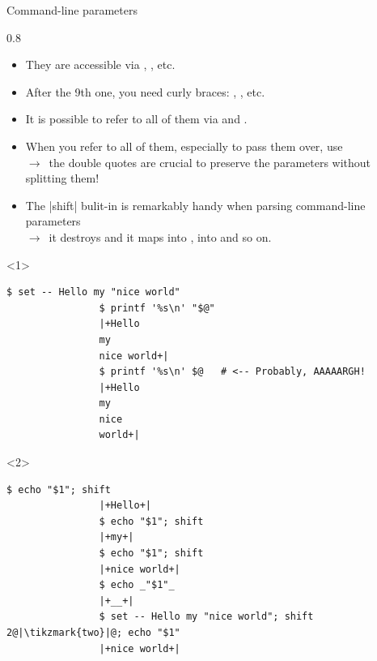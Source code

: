 
\begin{frame}[fragile]{Command-line parameters}
    \begin{overlayarea}{\textwidth}{0.8\textheight}
        \begin{itemize}
            \item They are accessible via , , etc.
            \item After the 9th one, you need curly braces: , , etc.
            \item It is possible to refer to all of them via  and \PB{\texttt{\$*}}.
            \item When you refer to all of them, especially to pass them over, use \\
                  $\to\,$ the double quotes are \alert{crucial} to preserve the parameters without splitting them!
            \item The \bash|shift| bulit-in is remarkably handy when parsing command-line parameters\\
                  $\to\,$ it destroys  and it maps  into ,  into  and so on.
        \end{itemize}
        \begin{onlyenv}<1>
            \begin{lstlisting}[style=MyBash]
                $ set -- Hello my "nice world"
                $ printf '%s\n' "$@"
                |+Hello
                my
                nice world+|
                $ printf '%s\n' $@   # <-- Probably, AAAAARGH!
                |+Hello
                my
                nice
                world+|
            \end{lstlisting}
        \end{onlyenv}
        \begin{onlyenv}<2>
            \begin{lstlisting}[style=MyBash, firstnumber=11]
                $ echo "$1"; shift
                |+Hello+|
                $ echo "$1"; shift
                |+my+|
                $ echo "$1"; shift
                |+nice world+|
                $ echo _"$1"_
                |+__+|
                $ set -- Hello my "nice world"; shift 2@|\tikzmark{two}|@; echo "$1"
                |+nice world+|
            \end{lstlisting}
        \end{onlyenv}
    \end{overlayarea}
\end{frame}
